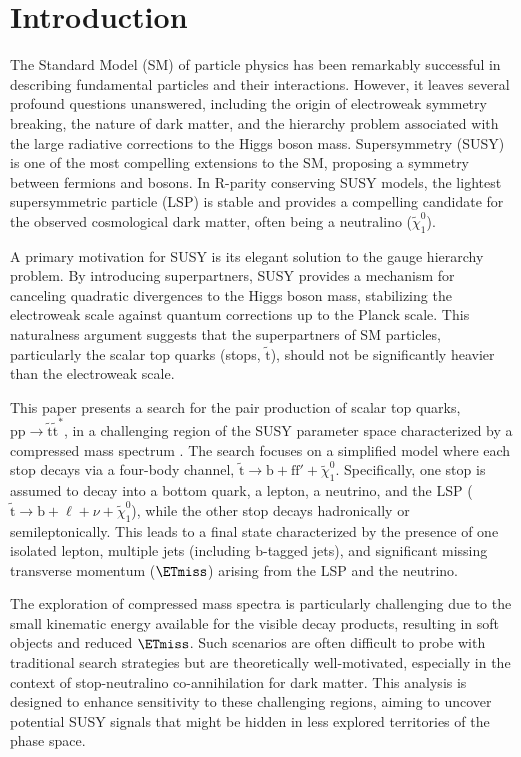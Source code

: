 \section{Introduction}
The Standard Model (SM) of particle physics has been remarkably successful in describing fundamental particles and their interactions. However, it leaves several profound questions unanswered, including the origin of electroweak symmetry breaking, the nature of dark matter, and the hierarchy problem associated with the large radiative corrections to the Higgs boson mass. Supersymmetry (SUSY) \cite{Martin:1997un} is one of the most compelling extensions to the SM, proposing a symmetry between fermions and bosons. In R-parity conserving SUSY models, the lightest supersymmetric particle (LSP) is stable and provides a compelling candidate for the observed cosmological dark matter, often being a neutralino ($\tilde{\chi}_1^0$).

A primary motivation for SUSY is its elegant solution to the gauge hierarchy problem. By introducing superpartners, SUSY provides a mechanism for canceling quadratic divergences to the Higgs boson mass, stabilizing the electroweak scale against quantum corrections up to the Planck scale. This naturalness argument suggests that the superpartners of SM particles, particularly the scalar top quarks (stops, $\tilde{\mathrm{t}}$), should not be significantly heavier than the electroweak scale.

This paper presents a search for the pair production of scalar top quarks, $\mathrm{pp} \to \tilde{\mathrm{t}}\tilde{\mathrm{t}}^*$, in a challenging region of the SUSY parameter space characterized by a compressed mass spectrum \cite{CMS-SUS-21-002}. The search focuses on a simplified model where each stop decays via a four-body channel, $\tilde{\mathrm{t}} \to \mathrm{b} + \mathrm{f}\mathrm{f}' + \tilde{\chi}_1^0$. Specifically, one stop is assumed to decay into a bottom quark, a lepton, a neutrino, and the LSP ($\tilde{\mathrm{t}} \to \mathrm{b} + \ell + \nu + \tilde{\chi}_1^0$), while the other stop decays hadronically or semileptonically. This leads to a final state characterized by the presence of one isolated lepton, multiple jets (including b-tagged jets), and significant missing transverse momentum ($\ETmiss$) arising from the LSP and the neutrino.

The exploration of compressed mass spectra is particularly challenging due to the small kinematic energy available for the visible decay products, resulting in soft objects and reduced $\ETmiss$. Such scenarios are often difficult to probe with traditional search strategies but are theoretically well-motivated, especially in the context of stop-neutralino co-annihilation for dark matter. This analysis is designed to enhance sensitivity to these challenging regions, aiming to uncover potential SUSY signals that might be hidden in less explored territories of the phase space.

